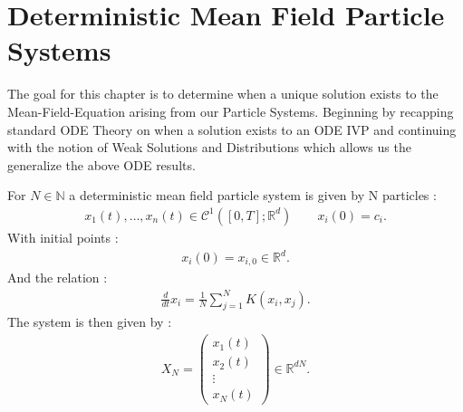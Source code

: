 \chapter{Deterministic Mean Field Particle Systems}
The goal for this chapter is to determine when a unique solution exists
to the Mean-Field-Equation arising from our Particle Systems.
Beginning by recapping standard ODE Theory on when a solution exists to an ODE IVP 
and continuing with the notion of Weak Solutions and Distributions which allows us the generalize the above 
ODE results.
\begin{definition}
  For $N \in  \mathbb{N}$ a deterministic mean field particle system is given by N particles : 
  \begin{align*}
   x_1(t),\ldots ,x_n(t) \in  \mathcal{C}^{1}([0,T];\mathbb{R}^{d } )  \qquad x_i(0) = c_i
  .\end{align*}
  With initial points : 
  \begin{align*}
    x_i(0) = x_{i,0} \in \mathbb{R}^{d} 
  .\end{align*}
  And the relation : 
  \begin{align*}
    \frac{d}{dt} x_{i} = \frac{1}{N} \sum_{j=1}^{N}  K(x_i,x_{j})
  .\end{align*}
  The system is then given by : 
  \begin{align*}
    X_N = \begin{pmatrix} x_1(t) \\ x_2(t) \\ \vdots \\ x_N(t)  \end{pmatrix} \in \mathbb{R}^{dN} 
  .\end{align*}
\end{definition}
